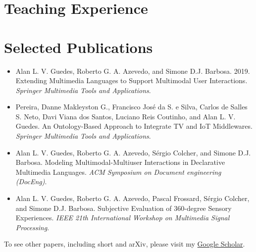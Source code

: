 \documentclass[10pt,a4paper,sans,colorlinks]{moderncv}
\begin{document}

\section{Teaching Experience}

\section{Selected Publications}
\begin{itemize}[mynosep]
  \item Alan L. V. Guedes, Roberto G. A. Azevedo, and Simone D.J. Barbosa. 2019. Extending Multimedia Languages to Support Multimodal User Interactions. \textit{Springer Multimedia Tools and Applications}.
  \item Pereira, Danne Makleyston G., Francisco José da S. e Silva, Carlos de Salles S. Neto, Davi Viana dos Santos, Luciano Reis Coutinho, and Alan L. V. Guedes. An Ontology-Based Approach to Integrate TV and IoT Middlewares. \textit{Springer Multimedia Tools and Applications}.
  \item Alan L. V. Guedes, Roberto G. A. Azevedo, Sérgio Colcher, and Simone D.J. Barbosa. Modeling Multimodal-Multiuser Interactions in Declarative Multimedia Languages. \textit{ACM Symposium on Document engineering (DocEng)}.
  \item Alan L. V. Guedes, Roberto G. A. Azevedo, Pascal Frossard, Sérgio Colcher, and Simone D.J. Barbosa. Subjective Evaluation of 360-degree Sensory Experiences. \textit{IEEE 21th International Workshop on Multimedia Signal Processing}.
\end{itemize}

To see other papers, including short and arXiv, please visit my \href{https://scholar.google.com/citations?user=1bEOmkUAAAAJ&hl=en}{Google Scholar}.
\end{document}
